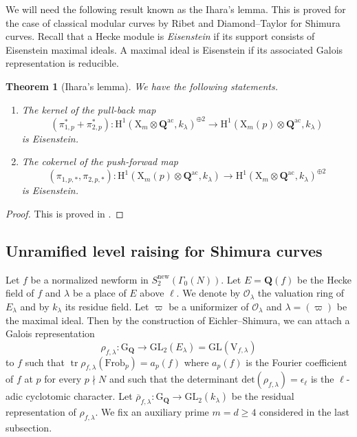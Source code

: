 \documentclass[10pt]{amsart}
\numberwithin{equation}{section}
\theoremstyle{plain}
\newtheorem{theorem}{Theorem}[section]
\numberwithin{equation}{section}
\theoremstyle{definition}
\theoremstyle{remark}
\def\GL{\mathrm{GL}}
\def\det{\mathrm{det}}
\def\Frob{\mathrm{Frob}}
\def\ac{\mathrm{ac}}
\def\Qbar{\QQ^{\ac}}
\def\ac{\mathrm{ac}}
\DeclareMathOperator{\tr}{tr}
\def\calO{\mathcal{O}}
\def\QQ{\mathbf{Q}}
\def\rmG{\mathrm{G}}
\def\rmH{\mathrm{H}}
\def\rmX{\mathrm{X}}
\def\rmV{\mathrm{V}}
\begin{document}
We will need the following result known as  the Ihara's lemma. This is proved for the case of classical modular curves by Ribet \cite{Ri-ICM} and Diamond--Taylor \cite{DT} for Shimura curves.  Recall that a Hecke module is \emph{Eisenstein} if its support consists of Eisenstein maximal ideals. A maximal ideal is Eisenstein if its associated Galois representation is reducible. 
\begin{theorem}[Ihara's lemma] \label{DT}
We have the following statements.
\begin{enumerate}
\item The kernel of the pull-back map
\begin{equation*}
(\pi^{*}_{1, p}+\pi^{*}_{2, p}): \rmH^{1}(\rmX_{m}\otimes \Qbar, k_{\lambda})^{\oplus 2} \rightarrow \rmH^{1}(\rmX_{m}(p)\otimes{\Qbar}, k_{\lambda})
\end{equation*}
is Eisenstein.
\item The cokernel of the push-forwad map
\begin{equation*}
(\pi_{1, p, *}, \pi_{2, p, *}): \rmH^{1}(\rmX_{m}(p)\otimes{\Qbar}, k_{\lambda})\rightarrow \rmH^{1}(\rmX_{m}\otimes{\Qbar}, k_{\lambda})^{\oplus 2}
\end{equation*}
is Eisenstein.
\end{enumerate}
\end{theorem}
\begin{proof}
This is proved in \cite[Theorem 2]{DT}.
\end{proof}

\subsection{Unramified level raising for Shimura curves} Let $f$ be a normalized newform in $S^{\mathrm{new}}_{2}(\Gamma_{0}(N))$. Let $E=\QQ(f)$ be the Hecke field of $f$ and  $\lambda$ be a place of $E$ above $\ell$. We denote by $\calO_{\lambda}$ the valuation ring of $E_{\lambda}$ and by $k_{\lambda}$ its residue field. Let $\varpi$ be a uniformizer of $\calO_{\lambda}$ and $\lambda=(\varpi)$ be the maximal ideal. 
Then by the construction of Eichler--Shimura, we can attach a Galois representation
\begin{equation*}
\rho_{f, \lambda}: \rmG_{\QQ}\rightarrow \GL_{2}({E_{\lambda}})=\GL(\rmV_{f,\lambda})
\end{equation*}
to $f$ such that $\tr\rho_{f,\lambda}(\Frob_{p})=a_{p}(f)$ where $a_{p}(f)$ is the Fourier coefficient of $f$ at $p$ for every $p\nmid N$ and such that the determinant $\det(\rho_{f, \lambda})=\epsilon_{\ell}$ is the $\ell$-adic cyclotomic character.  Let $\overline{\rho}_{f, \lambda}: \rmG_{\QQ}\rightarrow \GL_{2}(k_{\lambda})$
be the residual representation of $\rho_{f, \lambda}$. We fix an auxiliary prime $m=d\geq 4$ considered in the last subsection.
\end{document}
